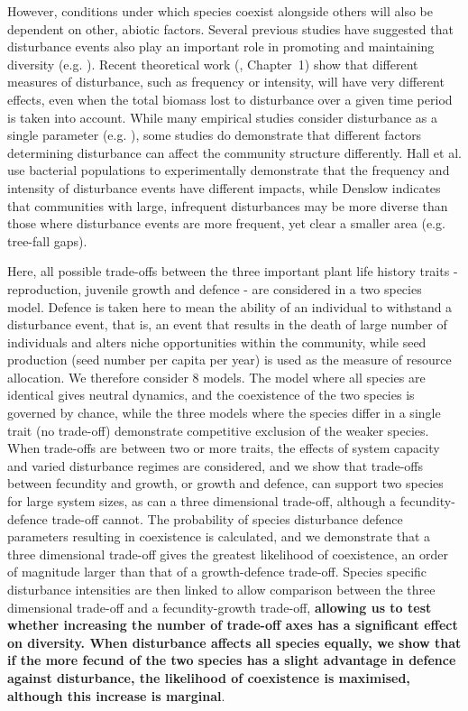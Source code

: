 However, conditions under which species coexist alongside others will also be dependent on other, abiotic factors. Several previous studies have suggested that disturbance events also play an important role in promoting and maintaining diversity (e.g. \cite{sousa1984role,denslow1987tropical}).  Recent theoretical work (\cite{miller2011frequency,nattrass2012quantifying}, Chapter~1) show that different measures of disturbance, such as frequency or intensity, will have very different effects, even when the total biomass lost to disturbance over a given time period is taken into account. While many empirical studies consider disturbance as a single parameter (e.g. \cite{molino2001tree,peterson1997tornado,nakagawa2000impact}), some studies do demonstrate that different factors determining disturbance can affect the community structure differently. Hall et al. \cite{hall2012diversity} use bacterial populations to experimentally demonstrate that the frequency and intensity of disturbance events have different impacts, while Denslow \cite{denslow1980patterns} indicates that communities with large, infrequent disturbances may be more diverse than those where disturbance events are more frequent, yet clear a smaller area (e.g. tree-fall gaps). 

Here, all possible trade-offs between the three important plant life history traits - reproduction, juvenile growth and defence - are considered in a two species model. Defence is taken here to mean the ability of an individual to withstand a disturbance event, that is, an event that results in the death of large number of individuals and alters niche opportunities within the community, while seed production (seed number per capita per year) is used as the measure of resource allocation. We therefore consider 8 models. The model where all species are identical gives neutral dynamics, and the coexistence of the two species is governed by chance, while the three models where the species differ in a single trait (no trade-off) demonstrate competitive exclusion of the weaker species. When trade-offs are between two or more traits, the effects of system capacity and varied disturbance regimes  are considered, and we show that trade-offs between fecundity and growth, or growth and defence, can support two species for large system sizes, as can a three dimensional trade-off, although a fecundity-defence trade-off cannot. The probability of species disturbance defence parameters resulting in coexistence is calculated, and we demonstrate that a three dimensional trade-off gives the greatest likelihood of coexistence, an order of magnitude larger than that of a growth-defence trade-off. Species specific disturbance intensities are then linked to allow comparison between the three dimensional trade-off and a fecundity-growth trade-off, \textbf{allowing us to test whether increasing the number of trade-off axes has a significant effect on diversity. When disturbance affects all species equally, we show that if the more fecund of the two species has a slight advantage in defence against disturbance, the likelihood of coexistence is maximised, although this increase is marginal}.


